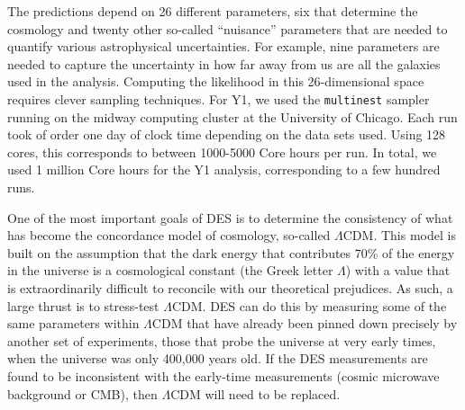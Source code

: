 \documentclass[12pt]{article}
\begin{document}
\begin{small}
The predictions depend on 26 different parameters, six that determine the cosmology and twenty other so-called ``nuisance'' parameters that are needed to quantify various astrophysical uncertainties. For example, nine parameters are needed to capture the uncertainty in how far away from us are all the galaxies used in the analysis. Computing the likelihood in this 26-dimensional space requires clever sampling techniques. For Y1, we used the {\tt multinest} sampler~\cite{Feroz:2008xx} running on the midway computing cluster at the University of Chicago. Each run took of order one day of clock time depending on the data sets used. Using 128 cores, this corresponds to between 1000-5000 Core hours per run. In total, we used 1 million Core hours for the Y1 analysis, corresponding to a few hundred runs. 

One of the most important goals of DES is to determine the consistency of what has become the concordance model of cosmology, so-called $\Lambda$CDM. This model is built on the assumption that the dark energy that contributes 70\% of the energy in the universe is a cosmological constant (the Greek letter $\Lambda$) with a value that is extraordinarily difficult to reconcile with our theoretical prejudices. As such, a large thrust is to stress-test $\Lambda$CDM. DES can do this by measuring some of the same parameters within $\Lambda$CDM that have already been pinned down precisely by another set of experiments, those that probe the universe at very early times, when the universe was only 400,000 years old. If the DES measurements are found to be inconsistent with the early-time measurements (cosmic microwave background or CMB), then $\Lambda$CDM will need to be replaced.

%



\end{small}
\end{document}
